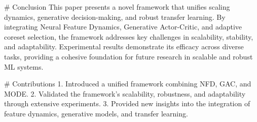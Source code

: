 # Conclusion  
This paper presents a novel framework that unifies scaling dynamics, generative decision-making, and robust transfer learning. By integrating Neural Feature Dynamics, Generative Actor-Critic, and adaptive coreset selection, the framework addresses key challenges in scalability, stability, and adaptability. Experimental results demonstrate its efficacy across diverse tasks, providing a cohesive foundation for future research in scalable and robust ML systems.

# Contributions  
1. Introduced a unified framework combining NFD, GAC, and MODE.  
2. Validated the framework's scalability, robustness, and adaptability through extensive experiments.  
3. Provided new insights into the integration of feature dynamics, generative models, and transfer learning.  